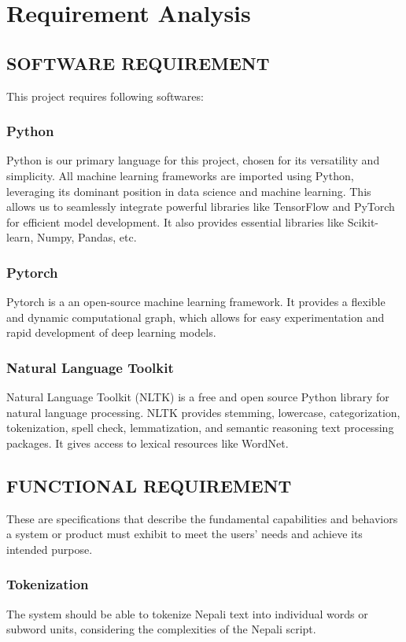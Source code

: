       \chapter{Requirement Analysis}
        \section{SOFTWARE REQUIREMENT}
            This project requires following softwares:
            \subsection*{Python} 
            Python is our primary language for this project, chosen for its versatility and simplicity. All machine learning frameworks are imported using Python, leveraging its dominant position in data science and machine learning. This allows us to seamlessly integrate powerful libraries like TensorFlow and PyTorch for efficient model development. It also provides essential libraries like Scikit-learn, Numpy, Pandas, etc.
        
            \subsection*{Pytorch}
            Pytorch is a an open-source machine learning framework. It provides a flexible and dynamic computational graph, which allows for easy experimentation and rapid development of deep learning models. 

            \subsection*{Natural Language Toolkit}
            Natural Language Toolkit (NLTK) is a free and open source Python library for natural language processing. NLTK provides stemming, lowercase, categorization, tokenization, spell check, lemmatization, and semantic reasoning text processing packages. It gives access to lexical resources like WordNet.

        \newpage        
        \section{FUNCTIONAL REQUIREMENT}
            These are specifications that describe the fundamental capabilities and behaviors a system or product must exhibit to meet the users' needs and achieve its intended purpose. 

            \subsection{Tokenization}
            The system should be able to tokenize Nepali text into individual words or subword units, considering the complexities of the Nepali script.

